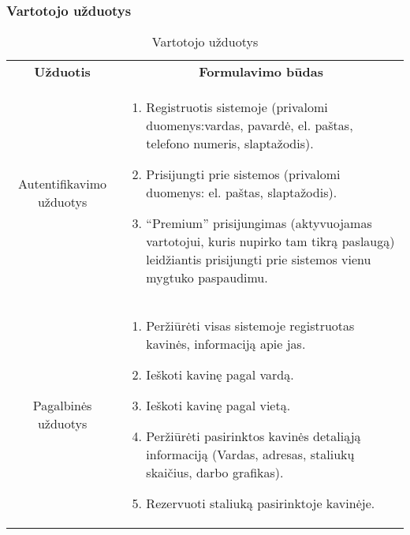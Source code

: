 \documentclass{VUMIFPSkursinis}
\begin{document}
\subsubsection{Vartotojo užduotys}
\begin{center}
	\begin{table}[H]
	\begin{tabular}{|p{2cm}|p{16cm}|}
	\hline
	    \rowcolor{lightgray}
		\multicolumn{2}{|c|}{Vartotojo užduotys}\\
		
	\hline
		\multicolumn{1}{|c|}{{\bfseries Užduotis}}&
		\multicolumn{1}{|c|}{{\bfseries Formulavimo būdas}}\\		
	\hline 	
		\multicolumn{1}{|c|}{Autentifikavimo užduotys}&
		\multicolumn{1}{|p{11,6cm}|}{
			\begin{enumerate}
				\item Registruotis sistemoje
				(privalomi duomenys:vardas, pavardė, el. paštas, telefono numeris, slaptažodis).
				\item Prisijungti prie sistemos (privalomi duomenys: el. paštas, slaptažodis).
				\item “Premium” prisijungimas (aktyvuojamas vartotojui, kuris nupirko tam tikrą paslaugą) leidžiantis prisijungti prie sistemos vienu mygtuko paspaudimu.
			\end{enumerate}}\\
	
	\hline 	
		\multicolumn{1}{|c|}{Pagalbinės užduotys}&
		\multicolumn{1}{|p{11,6cm}|}{
			\begin{enumerate}
				\item Peržiūrėti visas sistemoje registruotas kavinės, informaciją apie jas.
				\item Ieškoti kavinę pagal vardą.
				\item Ieškoti kavinę pagal vietą.
				\item Peržiūrėti pasirinktos kavinės detaliąją informaciją (Vardas, adresas, staliukų skaičius, darbo grafikas).
				\item Rezervuoti staliuką pasirinktoje kavinėje.
			\end{enumerate}}\\
	
	\hline 	 	
	\end{tabular}
	\caption{Vartotojo užduotys}
	\label{table:1}
	\end{table}

\end{center}
\end{document}
